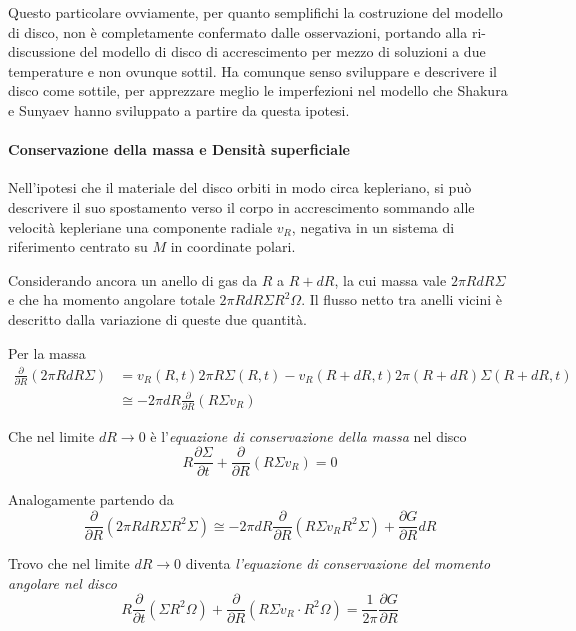 \documentclass[a4paperbi]{article}
\begin{document}
	Questo particolare ovviamente, per quanto semplifichi la costruzione del modello di disco, non è completamente confermato dalle osservazioni, portando alla ri-discussione del modello di disco di accrescimento per mezzo di soluzioni a due temperature e non ovunque sottil. Ha comunque senso sviluppare e descrivere il disco come sottile, per apprezzare meglio le imperfezioni nel modello che Shakura e Sunyaev hanno sviluppato a partire da questa ipotesi.
		
	\paragraph{Conservazione della massa e Densità superficiale}
		Nell'ipotesi che il materiale del disco orbiti in modo circa kepleriano, si può descrivere il suo spostamento verso il corpo in accrescimento sommando alle velocità kepleriane una componente radiale $v_R$, negativa in un sistema di riferimento centrato su $M$ in coordinate polari.

	Considerando ancora un anello di gas da $R$ a $R+dR$, la cui massa vale $2\pi RdR\Sigma$ e che ha momento angolare totale $2\pi RdR\Sigma R^2\Omega$. Il flusso netto tra anelli vicini è descritto dalla variazione di queste due quantità. 
	
	Per la massa
	\begin{align*}
		\frac{\partial}{\partial R}(2\pi RdR\Sigma)&=v_R(R,t)2\pi R\Sigma(R,t)-v_R(R+dR,t)2\pi(R+dR)\Sigma(R+dR,t)\\
		&\cong-2\pi dR\frac{\partial}{\partial R}(R\Sigma v_R)
	\end{align*}
	
	Che nel limite $dR\rightarrow 0$ è l'\textit{equazione di conservazione della massa} nel disco
	\begin{equation}
		R\frac{\partial\Sigma}{\partial t}+\frac{\partial}{\partial R}(R\Sigma v_R)=0
	\end{equation}
	
	Analogamente partendo da
	\begin{equation*}
		\frac{\partial}{\partial R}(2\pi RdR\Sigma R^2\Sigma)\cong-2\pi dR\frac{\partial}{\partial R}(R\Sigma v_R R^2\Sigma)+\frac{\partial G}{\partial R}dR	
	\end{equation*}
	
	Trovo che nel limite $dR\rightarrow 0$ diventa \textit{l'equazione di conservazione del momento angolare nel disco}
	\begin{equation}
		R\frac{\partial}{\partial t}(\Sigma R^2\Omega)+\frac{\partial}{\partial R}(R\Sigma v_R\cdot R^2\Omega)=\frac{1}{2\pi}\frac{\partial G}{\partial R}
	\end{equation}
	
\end{document}
